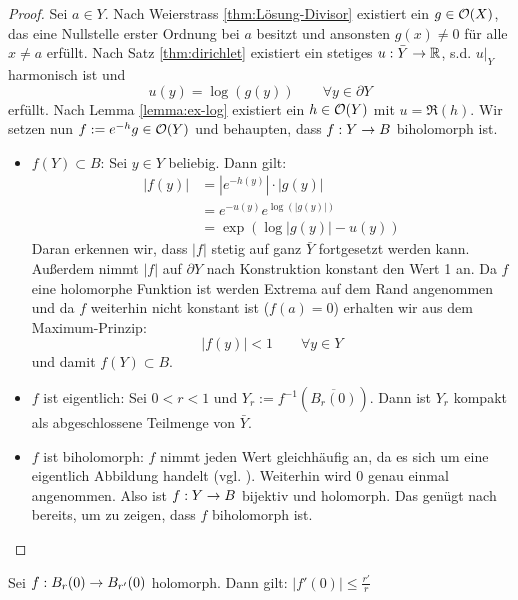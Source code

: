 \begin{proof}
  Sei $a \in Y$. Nach Weierstrass \ref{thm:Lösung-Divisor} existiert ein $g \in
  \mathcal{O}(X)$, das eine Nullstelle erster Ordnung bei $a$ besitzt und
  ansonsten $g(x) \neq 0$ für alle $x \neq a$ erfüllt. 
  Nach Satz \ref{thm:dirichlet} existiert ein stetiges $u: \bar Y \rightarrow
  \mathbb{R}$, s.d. $u|_Y$ harmonisch ist und
  \[
  u(y) = \log(g(y)) \qquad \forall y \in \partial Y
  \]
  erfüllt. 
  Nach Lemma \ref{lemma:ex-log} existiert ein $h \in \mathcal{O}(Y)$ mit $u =
  \Re(h)$. 
  Wir setzen nun $f := e^{-h} g \in \mathcal{O}(Y)$ und behaupten, dass $f: Y \rightarrow
  B$ biholomorph ist.
  \begin{itemize}
  \item $f(Y) \subset B$: Sei $y \in Y$ beliebig. Dann gilt:
    \begin{align*}
      |f(y)| & = | e^{-h(y)} | \cdot | g(y)| \\
      & = e^{-u(y)} e^{\log(|g(y)|)} \\
      & = \exp(\log|g(y)| - u(y))
    \end{align*}
    Daran erkennen wir, dass $|f|$ stetig auf ganz $\bar Y$ fortgesetzt werden
    kann. Außerdem nimmt $|f|$ auf $\partial Y$ nach Konstruktion konstant den Wert 1 an. Da
    $f$ eine holomorphe Funktion ist werden Extrema auf dem Rand
    angenommen und da $f$ weiterhin nicht konstant ist ($f(a) = 0$)
    erhalten wir aus dem Maximum-Prinzip:
    \[
    |f(y)| < 1 \qquad \forall y \in Y
    \]
    und damit $f(Y) \subset B$.
  \item $f$ ist eigentlich: Sei $0 < r < 1$ und $Y_r :=
    f^{-1}(\overline{B_r(0)})$. 
    Dann ist $Y_r$ kompakt als abgeschlossene Teilmenge von $\bar Y$.
  \item $f$ ist biholomorph: $f$ nimmt jeden Wert gleichhäufig an, da
    es sich um eine eigentlich Abbildung handelt (vgl. \cite[Satz 4.24]{For}). Weiterhin wird $0$
    genau einmal angenommen. Also ist $f: Y \rightarrow B$ bijektiv und
    holomorph. Das genügt nach \cite[Kor. 2.5]{For} bereits, um zu zeigen, dass $f$ biholomorph
    ist.

  \end{itemize}

\end{proof}

\begin{prop}
  \label{prop:kreis}
  Sei $f: B_r(0) \rightarrow B_{r'}(0)$ holomorph. Dann gilt: $|f'(0)| \leq \frac{r'}{r}$
\end{prop}

